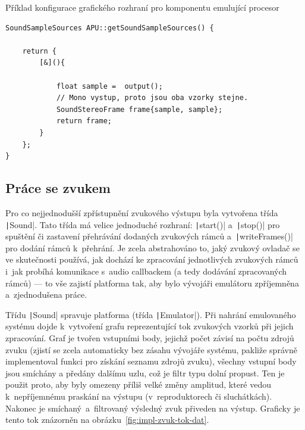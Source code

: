 \begin{listing}
	\caption{Příklad konfigurace grafického rozhraní pro komponentu emulující procesor}
	\label{list:use-konfigurace-audia}
	\begin{verbatim}
SoundSampleSources APU::getSoundSampleSources() {
	
	return {
		[&](){
			
			float sample =  output();
			// Mono vystup, proto jsou oba vzorky stejne.
			SoundStereoFrame frame{sample, sample};
			return frame;
		}
	};
}
	\end{verbatim}
\end{listing}

\subsection{Práce se zvukem}
Pro co nejjednodušší zpřístupnění zvukového výstupu byla vytvořena třída \texttt|Sound|. Tato třída má velice jednoduché rozhraní: \texttt|start()| a~\texttt|stop()| pro spuštění či zastavení přehrávání dodaných zvukových rámců a~\texttt|writeFrames()| pro dodání rámců k~přehrání. Je zcela abstrahováno to, jaký zvukový ovladač se ve skutečnosti používá, jak dochází ke zpracování jednotlivých zvukových rámců i~jak probíhá komunikace s~audio callbackem (a tedy dodávání zpracovaných rámců) --- to vše zajistí platforma tak, aby bylo vývojáři emulátoru zpříjemněna a~zjednodušena práce.

Třídu \texttt|Sound| spravuje platforma (třída \texttt|Emulator|). Při nahrání emulovaného systému dojde k~vytvoření grafu reprezentující tok zvukových vzorků při jejich zpracování. Graf je tvořen vstupními body, jejichž počet závisí na počtu zdrojů zvuku (zjistí se zcela automaticky bez zásahu vývojáře systému, pakliže správně implementoval funkci pro získání seznamu zdrojů zvuku), všechny vstupní body jsou smíchány a předány dalšímu uzlu, což je filtr typu dolní propust. Ten je použit proto, aby byly omezeny příliš velké změny amplitud, které vedou k~nepříjemnému praskání na výstupu (v~reproduktorech či sluchátkách). Nakonec je smíchaný~a~filtrovaný výsledný zvuk přiveden na výstup. Graficky je tento tok znázorněn na obrázku~\ref{fig:impl-zvuk-tok-dat}.

